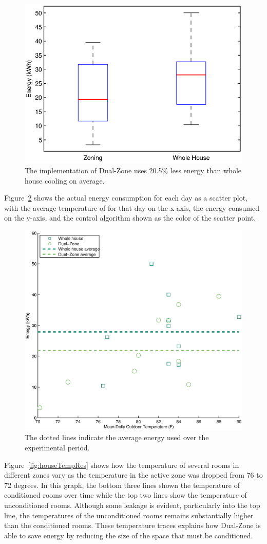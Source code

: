 \begin{figure}[!htb]
  \centering
  \includegraphics[width=0.6\columnwidth]{fig/cs1boxplot.eps}
  \caption[Energy usage of day/night zones vs. whole house conditioning]{The
  implementation of Dual-Zone uses 20.5\% less energy than whole house
  cooling on average.}
  \label{fig:energyBoxplot}
\end{figure}

Figure~\ref{fig:energy} shows the actual energy consumption for each day as a
scatter plot, with the average temperature of for that day on the x-axis, the
energy consumed on the y-axis, and the control algorithm shown as the color of
the scatter point.

\begin{figure}[!htb]
  \centering
  \includegraphics[width=0.6\columnwidth]{fig/meanEnergyScatter.eps}
  \caption[Effect of outdoor temperature on energy usage]{The dotted lines
  indicate the average energy used over the experimental period.}
  \label{fig:energy}
\end{figure}

Figure~\ref{fig:houseTempRes} shows how the temperature of several rooms in
different zones vary as the temperature in the active zone was dropped from 76
to 72 degrees.  In this graph, the bottom three lines shown the temperature of
conditioned rooms over time while the top two lines show the temperature of
unconditioned rooms.  Although some leakage is evident, particularly into the
top line, the temperatures of the unconditioned rooms remains substantially
higher than the conditioned rooms.  These temperature traces explains how
Dual-Zone is able to save energy by reducing the size of the space that
must be conditioned.

